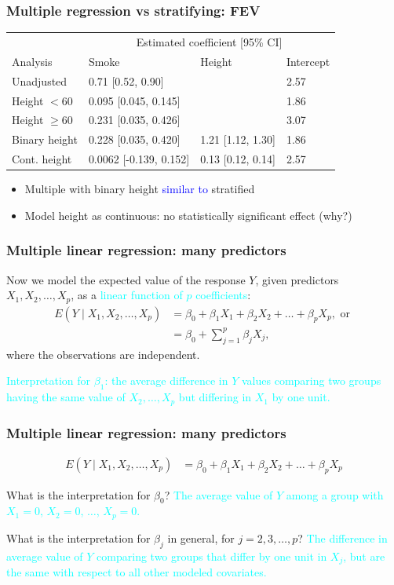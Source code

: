 \documentclass[12pt, 
hyperref={colorlinks=true, linkcolor=blue, urlcolor=cyan}]{beamer}
\begin{document}
\begin{frame}
\frametitle{Multiple regression vs stratifying: FEV}
\vspace{-1cm}\hspace*{-0.75cm}\begin{tabular}{llll}
& \multicolumn{3}{c}{Estimated coefficient [95\% CI]} \\
Analysis & Smoke & Height & Intercept \\
\hline
Unadjusted  & 0.71 [0.52, 0.90] & & 2.57\\
Height $< 60$ & 0.095 [0.045, 0.145]& & 1.86\\
Height $\geq 60$ & 0.231 [0.035, 0.426]& & 3.07 \\
Binary height & 0.228 [0.035, 0.420] & 1.21 [1.12, 1.30] & 1.86\\
Cont. height & 0.0062 [-0.139, 0.152]& 0.13 [0.12, 0.14] & 2.57
\end{tabular}

\begin{itemize}
\item Multiple with binary height \textcolor{blue}{similar to} stratified
\item Model height as continuous: no statistically significant effect (why?)
\end{itemize} 
\end{frame}

\begin{frame}
\frametitle{Multiple linear regression: many predictors}
Now we model the expected value of the response $Y$, given predictors $X_1, X_2, \dots, X_p$, as a \textcolor{cyan}{linear function of $p$ coefficients}:
\begin{align*}
E(Y \mid X_1, X_2, \dots, X_p) &= \beta_0 + \beta_1 X_1 + \beta_2 X_2 + \dots + \beta_p X_p, \text{ or } \\
&= \beta_0 + \sum_{j=1}^p \beta_j X_j,
\end{align*} 
where the observations are independent.

\textcolor{cyan}{Interpretation for $\beta_1$: the average difference in $Y$ values comparing two groups having the same value of $X_2, \dots, X_p$ but differing in $X_1$ by one unit.}

\end{frame}

\begin{frame}
\frametitle{Multiple linear regression: many predictors}
\begin{align*}
E(Y \mid X_1, X_2, \dots, X_p) &= \beta_0 + \beta_1 X_1 + \beta_2 X_2 + \dots + \beta_p X_p
\end{align*}

What is the interpretation for $\beta_0$? \pause \textcolor{cyan}{The average value of $Y$ among a group with $X_1 = 0$, $X_2 = 0$, $\dots$, $X_p = 0$.} \pause

What is the interpretation for $\beta_j$ in general, for $j = 2, 3, \dots, p$? \pause \textcolor{cyan}{The difference in average value of $Y$ comparing two groups that differ by one unit in $X_j$, but are the same with respect to all other modeled covariates.}

\end{frame}
\end{document}

